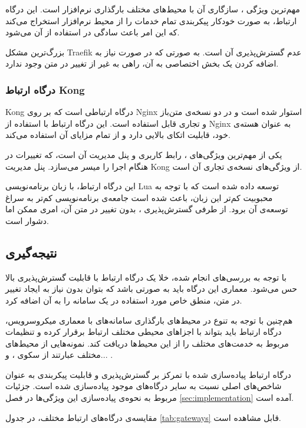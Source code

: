 مهم‌ترین ویژگی ، سازگاری آن با محیط‌های مختلف بارگذاری نرم‌افزار است. این درگاه ارتباط، به صورت خودکار پیکربندی تمام خدمات را از محیط نرم‌افزار استخراج می‌کند که این امر باعث سادگی در استفاده از آن می‌شود.

بزرگ‌ترین مشکل Traefik عدم گسترش‌پذیری آن است. به صورتی که در صورت نیاز به اضافه کردن یک بخش اختصاصی به آن، راهی به غیر از تغییر در متن وجود ندارد.

\subsubsection{درگاه ارتباط Kong}
Kong درگاه ارتباطی است که بر روی Nginx استوار شده است و در دو نسخه‌ی متن‌باز و تجاری قابل استفاده است. این درگاه ارتباط با استفاده از Nginx به عنوان هسته‌ی خود، قابلیت اتکای بالایی دارد و از تمام مزایای آن استفاده می‌کند.

یکی از مهم‌ترین ویژگی‌های ، رابط کاربری و پنل مدیریت آن است، که تغییرات در هنگام اجرا را میسر می‌سازد. پنل مدیریت Kong از ویژگی‌های نسخه‌ی
تجاری آن است.

این درگاه ارتباط،‌ با زبان برنامه‌نویسی Lua توسعه داده شده است که با توجه به محبوبیت کم‌تر این زبان، باعث شده‌ است جامعه‌ی برنامه‌نویسی کم‌تر به سراغ توسعه‌ی آن برود. از طرفی گسترش‌پذیری ، بدون تغییر در متن آن، امری ممکن اما دشوار است.

\subsection{نتیجه‌گیری}\label{subsec:sources_results}
با توجه به بررسی‌های انجام شده،‌ خلا یک درگاه ارتباط با قابلیت گسترش‌پذیری بالا حس می‌شود. معماری این درگاه باید به صورتی باشد که بتوان بدون نیاز به ایجاد تغییر در متن، منطق خاص مورد استفاده در یک سامانه را به آن اضافه کرد.

هم‌چنین با توجه به تنوع در محیط‌های بارگذاری سامانه‌های با معماری میکروسرویس، درگاه ارتباط باید بتواند با اجزاهای محیطی مختلف ارتباط برقرار کرده و تنظیمات مربوط به خدمت‌های مختلف را از این محیط‌ها دریافت کند. نمونه‌هایی از محیط‌های مختلف عبارتند از سکوی
،  و... .

درگاه ارتباط پیاده‌سازی شده با تمرکز بر گسترش‌پذیری و قابلیت پیکربندی به عنوان شاخص‌های اصلی نسبت به سایر درگاه‌های موجود پیاده‌سازی شده است. جزئیات مربوط به نحوه‌ی پیاده‌سازی این ویژگی‌ها در فصل
\ref{sec:implementation}
آمده است.

مقایسه‌ی درگاه‌های ارتباط مختلف، در جدول
\ref{tab:gateways}
قابل مشاهده است.


